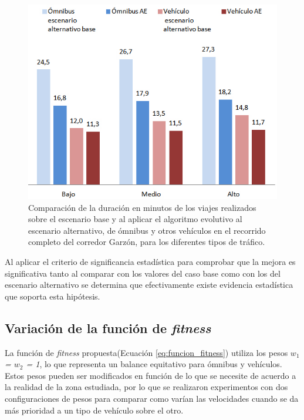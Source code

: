 \begin{figure}[ht]
	\centering
	\includegraphics[width=0.8\linewidth]{Figures/duracio_viajes_alternativo}
	\caption[Comparación de la duración de los viajes en minutos entre el escenario base y el algoritmo evolutivo sobre el escenario alternativo.]{Comparación de la duración en minutos de los viajes realizados sobre el escenario base y al aplicar el algoritmo evolutivo  al escenario alternativo, de ómnibus y otros vehículos en el recorrido completo del corredor Garzón, para los diferentes tipos de tráfico.}
	\label{fig:duracion_viajes_alernativo}
\end{figure}

Al aplicar el criterio de significancia estadística para comprobar que la mejora es significativa tanto al comparar con los valores del caso base como con los del escenario alternativo se determina que efectivamente existe evidencia estadística que soporta esta hipótesis.

\subsection{Variación de la función de \emph{fitness}}

La función de \emph{fitness} propuesta(Ecuación \ref{eq:funcion_fitness}) utiliza los pesos \emph{$w_1$ = $w_2$ = 1}, lo que representa un balance equitativo para ómnibus y vehículos. Estos pesos pueden ser modificados en función de lo que se necesite de acuerdo a la realidad de la zona estudiada, por lo que se realizaron experimentos con dos configuraciones de pesos para comparar como varían las velocidades cuando se da más prioridad a un tipo de vehículo sobre el otro.



